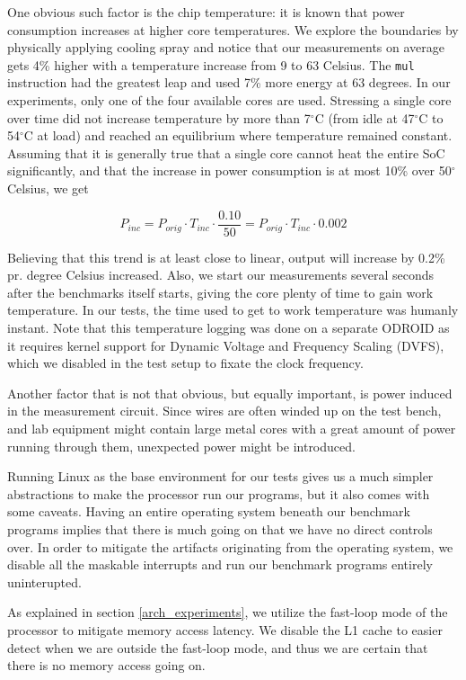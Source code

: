 \label{sec:temperature}
One obvious such factor is the chip temperature: it is known that power
consumption increases at higher core temperatures. We explore the boundaries by
physically applying cooling spray and notice that our measurements on average
gets 4\% higher with a temperature increase from 9 to 63 Celsius. The
\texttt{mul} instruction had the greatest leap and used 7\% more energy at 63
degrees. In our experiments, only one of the four available cores are used.
Stressing a single core over time did not increase temperature by more than
7$^\circ$C (from idle at 47$^\circ$C to 54$^\circ$C at load) and reached an
equilibrium where temperature remained constant. Assuming that it is generally
true that a single core cannot heat the entire SoC significantly, and that the
increase in power consumption is at most 10\% over 50$^\circ$ Celsius, we get

\begin{equation}
    P_{inc} = P_{orig} \cdot T_{inc} \cdot \frac{0.10}{50} = P_{orig} \cdot T_{inc} \cdot 0.002
\end{equation}

Believing that this trend is at least close to linear, output will increase by
0.2\% pr. degree Celsius increased. Also, we start our measurements several
seconds after the benchmarks itself starts, giving the core plenty of time to
gain work temperature. In our tests, the time used to get to work temperature
was humanly instant. Note that this temperature logging was done on a separate
ODROID as it requires kernel support for Dynamic Voltage and Frequency Scaling
(DVFS), which we disabled in the test setup to fixate the clock frequency.

Another factor that is not that obvious, but equally important, is power
induced in the measurement circuit. Since wires are often winded up on the test
bench, and lab equipment might contain large metal cores with a great amount of
power running through them, unexpected power might be introduced.

Running Linux as the base environment for our tests gives us a much simpler
abstractions to make the processor run our programs, but it also comes with some
caveats. Having an entire operating system beneath our benchmark programs
implies that there is much going on that we have no direct controls over. In
order to mitigate the artifacts originating from the operating system, we
disable all the maskable interrupts and run our benchmark programs entirely
uninterupted.

As explained in section \autoref{arch_experiments}, we utilize the fast-loop mode of
the processor to mitigate memory access latency. We disable the L1 cache to
easier detect when we are outside the fast-loop mode, and thus we are certain
that there is no memory access going on.

